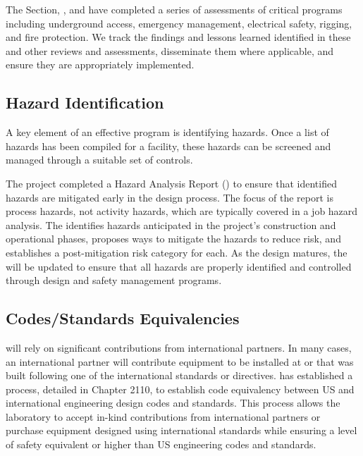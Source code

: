 
The \fnal {} Section, , and
  have completed a series of assessments of
critical   programs including underground access,
emergency management, electrical safety, rigging, and fire
protection. We track the findings and lessons learned identified in these
 and other reviews and assessments, 
disseminate them where applicable, and ensure they are appropriately implemented.

\subsection{Hazard Identification}
\label{sec:es-tc-eshq-har}

A key element of an effective  program is identifying hazards. 
Once a list of hazards has been compiled for a facility, these hazards can be screened
and managed through a suitable set of controls.

The  project completed a Hazard Analysis Report ()
to ensure that identified hazards are mitigated early in the
design process.  The focus of the report is process hazards,
not activity hazards, which are typically covered in a job hazard
analysis.  The   identifies
hazards anticipated in the project's construction and operational
phases, proposes ways to mitigate the hazards to reduce risk, and establishes a
post-mitigation risk category for each.  As the  design 
matures, the  will be
updated to ensure that all hazards are properly identified and
controlled through design and safety management programs.

\subsection{Codes/Standards Equivalencies}
\label{sec:es-tc-esh_codes}

 will rely on significant contributions from international
partners. In many cases, an international partner will contribute
equipment to be installed at  or  
that was built following one of the
international standards or directives.  has established a
process, detailed in  Chapter 2110, to establish code
equivalency between US and international engineering design codes
and standards. This process allows the laboratory to accept in-kind
contributions from international partners or purchase equipment
designed using international standards while ensuring a level of safety equivalent or
higher than US engineering codes and standards.


